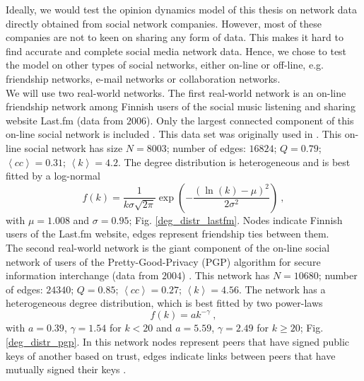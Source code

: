 \documentclass[11 pt , letterpaper , twoside , openright]{book}
\begin{document}
\newline
Ideally, we would test the opinion dynamics model of this thesis on network data directly obtained from social network companies. However, most of these companies are not to keen on sharing any form of data. This makes it hard to find accurate and complete social media network data. Hence, we chose to test the model on other types of social networks, either on-line or off-line, e.g. friendship networks, e-mail networks or collaboration networks. \\
\newline
We will use two real-world networks. The first real-world network is an on-line friendship network among Finnish users of the social music listening and sharing website Last.fm (data from $2006$). Only the largest connected component of this on-line social network is included \cite{ICON}. This data set was originally used in \cite{Toivonen2009}. This on-line social network has size $N = 8003$; number of edges: $16824$; $Q = 0.79$; $\left<cc\right> = 0.31$; $\left<k\right> = 4.2$. The degree distribution is heterogeneous and is best fitted by a log-normal
\begin{equation}
	f(k) = \frac{1}{k \sigma \sqrt{2\pi}} \exp(-\frac{(\ln(k) - \mu)^2}{2 \sigma^2})\ ,
\end{equation}
with $\mu = 1.008$ and $\sigma = 0.95$; Fig. \ref{deg_distr_lastfm}. Nodes indicate Finnish users of the Last.fm website, edges represent friendship ties between them.\\
\newline
The second real-world network is the giant component of the on-line social network of users of the Pretty-Good-Privacy (PGP) algorithm for secure information interchange (data from $2004$) \cite{Boguna2004}\cite{ICON}. This network has $N = 10680$; number of edges: $24340$; $Q = 0.85$; $\left<cc\right> = 0.27$; $\left<k\right> = 4.56$. The network has a heterogeneous degree distribution, which is best fitted by two power-laws
\begin{equation}
 f(k) = a k^{-\gamma} \ ,
\end{equation}
with $a = 0.39$, $\gamma = 1.54$ for $k < 20$ and $a = 5.59$, $\gamma = 2.49$ for $k \geqslant 20$; Fig. \ref{deg_distr_pgp}. In this network nodes represent peers that have signed public keys of another based on trust, edges indicate links between peers that have mutually signed their keys \cite{Boguna2004}.
\end{document}
